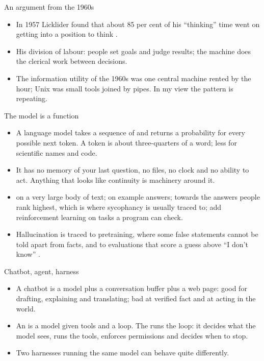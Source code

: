\documentclass[11pt,aspectratio=169]{beamer}
\begin{document}
\begin{frame}{An argument from the 1960s}
  \small
  \begin{itemize}
    \item In 1957 Licklider found that about 85 per cent of his ``thinking''
      time went on getting into a position to think
      \parencite{waldrop2002dreammachine}.
    \item His division of labour: people set goals and judge results; the
      machine does the clerical work between decisions.
    \item The information utility of the 1960s was one central machine rented
      by the hour; Unix was small tools joined by pipes. In my view the
      pattern is repeating.
  \end{itemize}
\end{frame}

\begin{frame}{The model is a function}
  \small
  \begin{itemize}
    \item A language model takes a sequence of  and returns a
      probability for every possible next token. A token is about
      three-quarters of a word; less for scientific names and code.
    \item It has no memory of your last question, no files, no clock and no
      ability to act. Anything that looks like continuity is machinery
      around it.
    \item {} on a very large body of text;  on example answers;  towards the answers
      people rank highest, which is where sycophancy is usually traced to;
       add reinforcement learning on tasks a program
      can check.
    \item Hallucination is traced to pretraining, where some false statements
      cannot be told apart from facts, and to evaluations that score a guess
      above ``I don't know'' \parencite{kalai2025hallucinate}.
  \end{itemize}
\end{frame}

\begin{frame}{Chatbot, agent, harness}
  \small
  \begin{itemize}
    \item A chatbot is a model plus a conversation buffer plus a web page:
      good for drafting, explaining and translating; bad at verified fact
      and at acting in the world.
    \item An  is a model given tools and a loop. The 
      runs the loop: it decides what the model sees, runs the tools, enforces
      permissions and decides when to stop.
    \item Two harnesses running the same model can behave quite differently.
  \end{itemize}
\end{frame}
\end{document}
